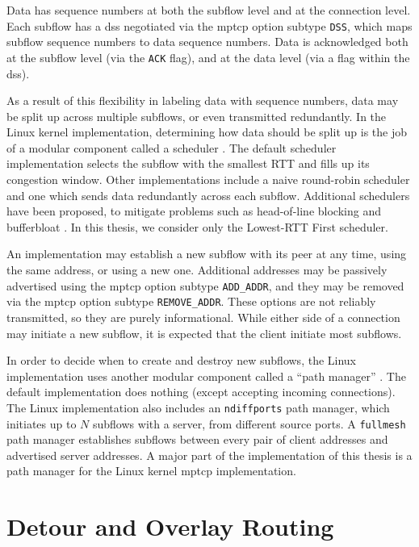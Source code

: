 \documentclass{cwru}
\begin{document}
Data has sequence numbers at both the subflow level and at the connection level.
Each subflow has a \ac{dss} negotiated via the \ac{mptcp} option subtype
\texttt{DSS}, which maps subflow sequence numbers to data sequence numbers. Data
is acknowledged both at the subflow level (via the \texttt{ACK} flag), and at
the data level (via a flag within the \ac{dss}).

As a result of this flexibility in labeling data with sequence numbers, data may
be split up across multiple subflows, or even transmitted redundantly. In the
Linux kernel implementation, determining how data should be split up is the job
of a modular component called a scheduler \cite{mptcp}. The default scheduler
implementation selects the subflow with the smallest RTT and fills up its
congestion window. Other implementations include a naive round-robin scheduler
and one which sends data redundantly across each subflow. Additional schedulers
have been proposed, to mitigate problems such as head-of-line blocking and
bufferbloat \cite{paasch2014experimental}. In this thesis, we consider only the
Lowest-RTT First scheduler.

An implementation may establish a new subflow with its peer at any time, using
the same address, or using a new one. Additional addresses may be passively
advertised using the \ac{mptcp} option subtype \texttt{ADD\_ADDR}, and they may
be removed via the \ac{mptcp} option subtype \texttt{REMOVE\_ADDR}. These
options are not reliably transmitted, so they are purely informational. While
either side of a connection may initiate a new subflow, it is expected that the
client initiate most subflows.

In order to decide when to create and destroy new subflows, the Linux
implementation uses another modular component called a ``path manager''
\cite{mptcp}. The default implementation does nothing (except accepting incoming
connections). The Linux implementation also includes an \texttt{ndiffports} path
manager, which initiates up to $N$ subflows with a server, from different source
ports. A \texttt{fullmesh} path manager establishes subflows between every pair
of client addresses and advertised server addresses. A major part of the
implementation of this thesis is a path manager for the Linux kernel \ac{mptcp}
implementation.

\section{Detour and Overlay Routing}
\end{document}
